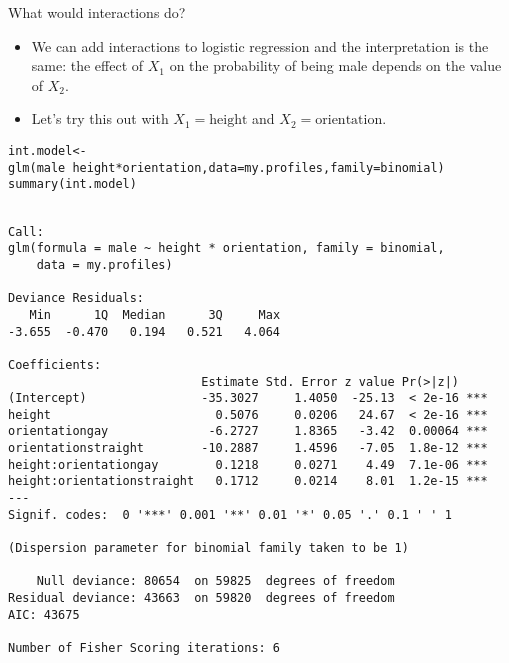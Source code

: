 \documentclass{beamer}\usepackage[]{graphicx}\usepackage[]{color}
\makeatletter
\newcommand{\hlopt}[1]{\textcolor[rgb]{1,0.894,0.769}{#1}}%
\newcommand{\hlstd}[1]{\textcolor[rgb]{1,0.894,0.769}{#1}}%
\newcommand{\hlkwb}[1]{\textcolor[rgb]{0.804,0.776,0.451}{#1}}%
\newcommand{\hlkwc}[1]{\textcolor[rgb]{0.78,0.941,0.545}{#1}}%
\newcommand{\hlkwd}[1]{\textcolor[rgb]{1,0.78,0.769}{#1}}%
\newenvironment{kframe}{%
 \def\at@end@of@kframe{}%
 \ifinner\ifhmode%
  \def\at@end@of@kframe{\end{minipage}}%
  \begin{minipage}{\columnwidth}%
 \fi\fi%
 \def\FrameCommand##1{\hskip\@totalleftmargin \hskip-\fboxsep
 \colorbox{shadecolor}{##1}\hskip-\fboxsep
     \hskip-\linewidth \hskip-\@totalleftmargin \hskip\columnwidth}%
 \MakeFramed {\advance\hsize-\width
   \@totalleftmargin\z@ \linewidth\hsize
   \@setminipage}}%
 {\par\unskip\endMakeFramed%
 \at@end@of@kframe}
\newenvironment{knitrout}{}{} %
\makeatother
\begin{document}
\begin{darkframes}
    \begin{frame}{What would interactions do?}
      \begin{itemize}
        \item We can add interactions to logistic regression and the interpretation is the same: the effect of $X_1$ on the \alert{probability of being male} depends on the \alert{value} of $X_2$.
        \item Let's try this out with $X_1=\text{height}$ and $X_2=\text{orientation}$.
      \end{itemize}
    \end{frame}

    \begin{frame}[fragile]
      \fontvsm
\begin{knitrout}
\color{fgcolor}\begin{kframe}
\begin{alltt}
\hlstd{int.model} \hlkwb{<-} \hlkwd{glm}\hlstd{(male} \hlopt{~} \hlstd{height} \hlopt{*} \hlstd{orientation,} \hlkwc{data}\hlstd{=my.profiles,} \hlkwc{family}\hlstd{=binomial)}
\hlkwd{summary}\hlstd{(int.model)}
\end{alltt}
\begin{verbatim}

Call:
glm(formula = male ~ height * orientation, family = binomial, 
    data = my.profiles)

Deviance Residuals: 
   Min      1Q  Median      3Q     Max  
-3.655  -0.470   0.194   0.521   4.064  

Coefficients:
                           Estimate Std. Error z value Pr(>|z|)    
(Intercept)                -35.3027     1.4050  -25.13  < 2e-16 ***
height                       0.5076     0.0206   24.67  < 2e-16 ***
orientationgay              -6.2727     1.8365   -3.42  0.00064 ***
orientationstraight        -10.2887     1.4596   -7.05  1.8e-12 ***
height:orientationgay        0.1218     0.0271    4.49  7.1e-06 ***
height:orientationstraight   0.1712     0.0214    8.01  1.2e-15 ***
---
Signif. codes:  0 '***' 0.001 '**' 0.01 '*' 0.05 '.' 0.1 ' ' 1

(Dispersion parameter for binomial family taken to be 1)

    Null deviance: 80654  on 59825  degrees of freedom
Residual deviance: 43663  on 59820  degrees of freedom
AIC: 43675

Number of Fisher Scoring iterations: 6
\end{verbatim}
\end{kframe}
\end{knitrout}
    \end{frame}


\end{darkframes}
\end{document}
